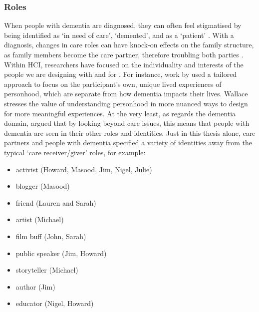 \subsubsection{Roles}
\label{Roles}
When people with dementia are diagnosed, they can often feel stigmatised by being identified as `in need of care’, `demented’, and  as a `patient’ \citep{benbow_dementia_2012}. With a diagnosis, changes in care roles can have knock-on effects on the family structure, as family members become the care partner, therefore troubling both parties \citep{lee_technology-based_2015}. Within HCI, researchers have focused on the individuality and interests of the people we are designing with and for \citep{lazar_rethinking_2016,brankaert_intersections_2019,foley_printer_2019,mcnaney_demyouth:_2017}. For instance, work by \cite{wallace_design-led_2013} used a tailored approach to focus on the participant's own, unique lived experiences of personhood, which are separate from how dementia impacts their lives. Wallace stresses the value of understanding personhood in more nuanced ways to design for more meaningful experiences. At the very least, as regards the dementia domain, \cite{bartlett2010broadening} argued that by looking beyond care issues, this means that people with dementia are seen in their other roles and identities. Just in this thesis alone, care partners and people with dementia specified a variety of identities away from the typical `care receiver/giver' roles, for example:

\begin{itemize}
\item	activist (Howard, Masood, Jim, Nigel, Julie)
\item	blogger (Masood)
\item	friend (Lauren and Sarah)
\item	artist (Michael)
\item	film buff (John, Sarah)
\item	public speaker (Jim, Howard)
\item	storyteller (Michael)
\item	author (Jim)
\item	educator (Nigel, Howard)
\end{itemize}

